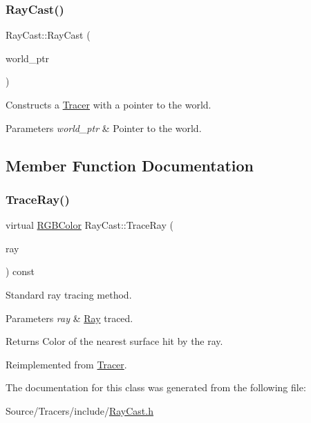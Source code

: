 \subsubsection{\texorpdfstring{Ray\+Cast()}{RayCast()}}
{\footnotesize\ttfamily Ray\+Cast\+::\+Ray\+Cast (\begin{DoxyParamCaption}\item[{std\+::shared\+\_\+ptr$<$ World $>$}]{world\+\_\+ptr }\end{DoxyParamCaption})}

Constructs a \hyperlink{class_tracer}{Tracer} with a pointer to the world. 
\begin{DoxyParams}{Parameters}
{\em world\+\_\+ptr} & Pointer to the world. \\
\hline
\end{DoxyParams}


\subsection{Member Function Documentation}
\hypertarget{class_ray_cast_aed24a822899e5328a7e668a479d3be9e}{}\label{class_ray_cast_aed24a822899e5328a7e668a479d3be9e} 
\subsubsection{\texorpdfstring{Trace\+Ray()}{TraceRay()}}
{\footnotesize\ttfamily virtual \hyperlink{class_r_g_b_color}{R\+G\+B\+Color} Ray\+Cast\+::\+Trace\+Ray (\begin{DoxyParamCaption}\item[{const \hyperlink{class_ray}{Ray} \&}]{ray }\end{DoxyParamCaption}) const\hspace{0.3cm}{\ttfamily [virtual]}}

Standard ray tracing method. 
\begin{DoxyParams}{Parameters}
{\em ray} & \hyperlink{class_ray}{Ray} traced. \\
\hline
\end{DoxyParams}
\begin{DoxyReturn}{Returns}
Color of the nearest surface hit by the ray. 
\end{DoxyReturn}


Reimplemented from \hyperlink{class_tracer_adbabdfde11e278945a0433d08445fcce}{Tracer}.



The documentation for this class was generated from the following file\+:\begin{DoxyCompactItemize}
\item 
Source/\+Tracers/include/\hyperlink{_ray_cast_8h}{Ray\+Cast.\+h}\end{DoxyCompactItemize}
